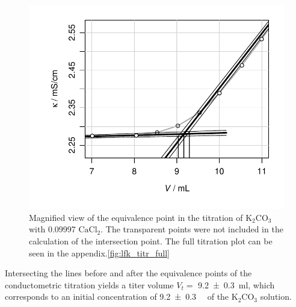 \begin{figure}[H]
    \centering
    \includegraphics[width=.5\textwidth]{figures/plots/lfk_titration_zoom.pdf}
    \caption{Magnified view of the equivalence point in the titration of $\mathrm{K_2CO_3}$ with \qty[round-precision=5]{0.09997}{\M} $\mathrm{CaCl_2}$. The transparent points were not included in the calculation of the intersection point. The full titration plot can be seen in the appendix.\ref{fig:lfk_titr_full}}
    \label{fig:lfk_titr_zoom}
\end{figure}

Intersecting the lines before and after the equivalence points of the conductometric titration yields a titer volume $V_t =$ \qty{9.2 \pm 0.3}{\milli\litre}, which corresponds to an initial concentration of \qty{9.2 \pm 0.3}{\milli\M} of the $\mathrm{K_2CO_3}$ solution.

